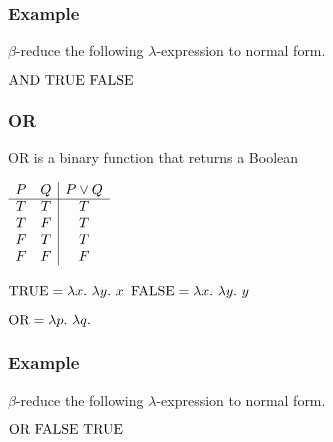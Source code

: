 \documentclass{beamer}
\begin{document}
\begin{frame}
	\frametitle{Example}

	$\beta$-reduce the following $\lambda$-expression to normal form.

	\vspace{0.5cm}

	$\text{AND} \ \text{TRUE} \ \text{FALSE}$

	\vspace{6cm}


\end{frame}

\begin{frame}
	\frametitle{OR}

	OR is a binary function that returns a Boolean

	\begin{center}
		$\begin{array}{ c c | c }			
			P & Q & P \lor Q\\
			\cline{1 - 3}
			T & T & T \\ 
			T & F & T \\ 
			F & T & T \\ 
			F & F & F
		\end{array}$
	\end{center}

	$\TRUE = \lambda x. \ \lambda y. \ x$ \hspace{4cm} $\FALSE = \lambda x. \ \lambda y. \ y$

	\vspace{0.5cm}

	$\OR = \lambda p. \ \lambda q. \  $

	\vspace{2cm}
	
\end{frame}

\begin{frame}
	\frametitle{Example}

	$\beta$-reduce the following $\lambda$-expression to normal form.

	\vspace{0.5cm}

	$\text{OR} \ \text{FALSE} \ \text{TRUE}$

	\vspace{6cm}


\end{frame}
\end{document}
